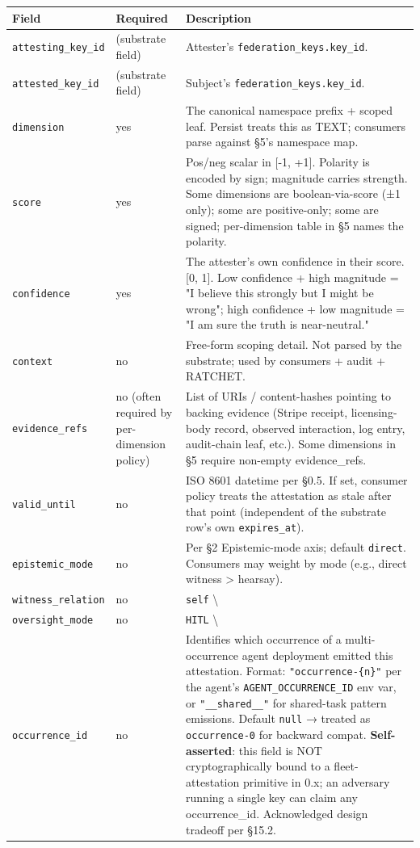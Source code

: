 \documentclass[11pt]{article}
\begin{document}
{\footnotesize
\begin{longtable}{|p{5.33cm}|p{5.33cm}|p{5.33cm}|}\hline
\textbf{Field} & \textbf{Required} & \textbf{Description} \\ \hline\endhead
\texttt{attesting\_key\_id} & (substrate field) & Attester's \texttt{federation\_keys.key\_id}. \\ \hline
\texttt{attested\_key\_id} & (substrate field) & Subject's \texttt{federation\_keys.key\_id}. \\ \hline
\texttt{dimension} & yes & The canonical namespace prefix + scoped leaf. Persist treats this as TEXT; consumers parse against §5's namespace map. \\ \hline
\texttt{score} & yes & Pos/neg scalar in [-1, +1]. Polarity is encoded by sign; magnitude carries strength. Some dimensions are boolean-via-score (±1 only); some are positive-only; some are signed; per-dimension table in §5 names the polarity. \\ \hline
\texttt{confidence} & yes & The attester's own confidence in their score. [0, 1]. Low confidence + high magnitude = "I believe this strongly but I might be wrong"; high confidence + low magnitude = "I am sure the truth is near-neutral." \\ \hline
\texttt{context} & no & Free-form scoping detail. Not parsed by the substrate; used by consumers + audit + RATCHET. \\ \hline
\texttt{evidence\_refs} & no (often required by per-dimension policy) & List of URIs / content-hashes pointing to backing evidence (Stripe receipt, licensing-body record, observed interaction, log entry, audit-chain leaf, etc.). Some dimensions in §5 require non-empty evidence\_refs. \\ \hline
\texttt{valid\_until} & no & ISO 8601 datetime per §0.5. If set, consumer policy treats the attestation as stale after that point (independent of the substrate row's own \texttt{expires\_at}). \\ \hline
\texttt{epistemic\_mode} & no & Per §2 Epistemic-mode axis; default \texttt{direct}. Consumers may weight by mode (e.g., direct witness > hearsay). \\ \hline
\texttt{witness\_relation} & no & \texttt{self} \textbackslash{} \\ \hline
\texttt{oversight\_mode} & no & \texttt{HITL} \textbackslash{} \\ \hline
\texttt{occurrence\_id} & no & Identifies which occurrence of a multi-occurrence agent deployment emitted this attestation. Format: \texttt{"occurrence-\{n\}"} per the agent's \texttt{AGENT\_OCCURRENCE\_ID} env var, or \texttt{"\_\_shared\_\_"} for shared-task pattern emissions. Default \texttt{null} → treated as \texttt{occurrence-0} for backward compat. \textbf{Self-asserted}: this field is NOT cryptographically bound to a fleet-attestation primitive in 0.x; an adversary running a single key can claim any occurrence\_id. Acknowledged design tradeoff per §15.2. \\ \hline

\end{longtable}}
\end{document}
